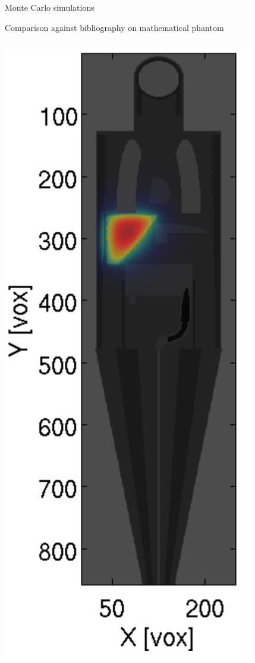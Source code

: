 \documentclass[ignorenonframetext,]{beamer}
\begin{document}
\begin{frame}{Monte Carlo simulations}
\protect\hypertarget{monte-carlo-simulations}{}

Comparison against bibliography on mathematical phantom

\begin{columns}
\begin{column}{.3\textwidth}
\begin{center}
\includegraphics[height=.8\textheight]{imgs/mc_comparison.png}

\end{center}
\end{column}
\end{columns}
\end{frame}
\end{document}
